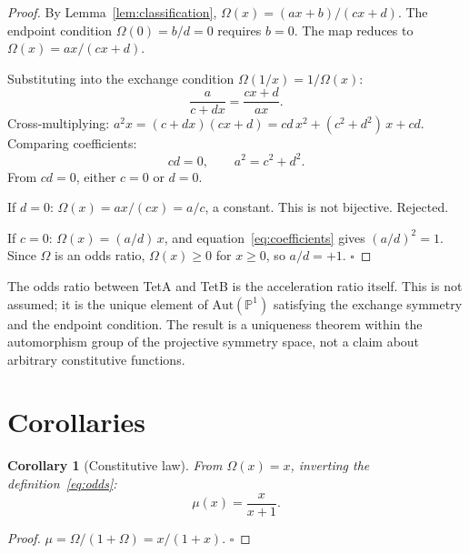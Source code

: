\documentclass[twocolumn]{iopjournal}
\newtheorem{corollary}[lemma]{Corollary}
\theoremstyle{definition}
\begin{document}
\begin{proof}
By Lemma~\ref{lem:classification},
$\Omega(x) = (ax+b)/(cx+d)$.
The endpoint condition $\Omega(0) = b/d = 0$ requires $b = 0$.
The map reduces to $\Omega(x) = ax/(cx + d)$.

Substituting into the exchange condition
$\Omega(1/x) = 1/\Omega(x)$:
\begin{equation}
  \frac{a}{c + dx} = \frac{cx + d}{ax}.
  \label{eq:exchange_sub}
\end{equation}
Cross-multiplying: $a^2 x = (c + dx)(cx + d)
= cd\,x^2 + (c^2 + d^2)\,x + cd$.  Comparing coefficients:
\begin{equation}
  cd = 0, \qquad a^2 = c^2 + d^2.
  \label{eq:coefficients}
\end{equation}
From $cd = 0$, either $c = 0$ or $d = 0$.

If $d = 0$: $\Omega(x) = ax/(cx) = a/c$, a constant.  This is
not bijective.  Rejected.

If $c = 0$: $\Omega(x) = (a/d)\,x$, and
equation~\eqref{eq:coefficients} gives $(a/d)^2 = 1$.  Since
$\Omega$ is an odds ratio, $\Omega(x) \geq 0$ for $x \geq 0$,
so $a/d = +1$.
\hfill$\square$
\end{proof}

\noindent
The odds ratio between TetA and TetB is the acceleration ratio
itself.  This is not assumed; it is the unique element of
$\mathrm{Aut}(\mathbb{P}^1)$ satisfying the exchange symmetry
and the endpoint condition.  The result is a uniqueness theorem
within the automorphism group of the projective symmetry space,
not a claim about arbitrary constitutive functions.


\section*{Corollaries}

\begin{corollary}[Constitutive law]
\label{cor:mu}
From $\Omega(x) = x$, inverting the
definition~\eqref{eq:odds}:
\begin{equation}
  \boxed{\mu(x) = \frac{x}{x + 1}.}
  \label{eq:mu}
\end{equation}
\end{corollary}

\begin{proof}
$\mu = \Omega/(1 + \Omega) = x/(1 + x)$.
\hfill$\square$
\end{proof}
\end{document}
